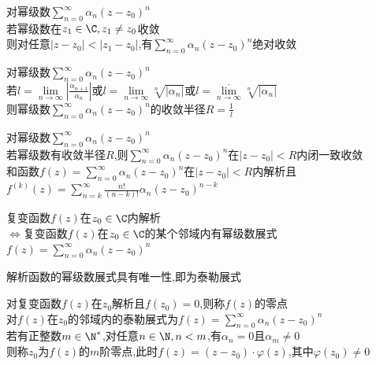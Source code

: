 \begin{dingli}
对幂级数$\sum\limits_{n=0}^{\infty}\alpha_n(z-z_0)^n$\\
若幂级数在$z_1\in \C,z_1\neq z_0$收敛\\
则对任意$|z-z_0|<|z_1-z_0|$,有$\sum\limits_{n=0}^{\infty}\alpha_n(z-z_0)^n$绝对收敛
\end{dingli}

\begin{dingli}
对幂级数$\sum\limits_{n=0}^{\infty}\alpha_n(z-z_0)^n$\\
若$l=\lim\limits_{n\to\infty}|\frac{\alpha_{n+1}}{\alpha_n}|$或$l=\lim\limits_{n\to\infty}\sqrt[n]{|\alpha_n|}$或$l=\overline{\lim\limits_{n\to\infty}}\sqrt[n]{|\alpha_n|}$\\
则幂级数$\sum\limits_{n=0}^{\infty}\alpha_n(z-z_0)^n$的收敛半径$R=\frac{1}{l}$
\end{dingli}

\begin{dingli}
对幂级数$\sum\limits_{n=0}^{\infty}\alpha_n(z-z_0)^n$\\
若幂级数有收敛半径$R$,则$\sum\limits_{n=0}^{\infty}\alpha_n(z-z_0)^n$在$|z-z_0|<R$内闭一致收敛\\
和函数$f(z)=\sum\limits_{n=0}^{\infty}\alpha_n(z-z_0)^n$在$|z-z_0|<R$内解析且$f^{(k)}(z)=\sum\limits_{n=k}^{\infty}\frac{n!}{(n-k)!}\alpha_n(z-z_0)^{n-k}$
\end{dingli}

\begin{dingli}
复变函数$f(z)$在$z_0\in \C$内解析\\
$\Leftrightarrow$复变函数$f(z)$在$z_0\in \C$的某个邻域内有幂级数展式$f(z)=\sum\limits_{n=0}^{\infty}\alpha_n(z-z_0)^n$
\end{dingli}

\begin{tuilun}
解析函数的幂级数展式具有唯一性,即为泰勒展式
\end{tuilun}

\begin{dingyi}
对复变函数$f(z)$在$z_0$解析且$f(z_0)=0$,则称$f(z)$的零点\\
对$f(z)$在$z_0$的邻域内的泰勒展式为$f(z)=\sum\limits_{n=0}^{\infty}\alpha_n(z-z_0)^n$\\
若有正整数$m\in\N^*$,对任意$n\in \N,n<m$,有$\alpha_n=0$且$\alpha_m\neq0$\\
则称$z_0$为$f(z)$的$m$阶零点,此时$f(z)=(z-z_0)\cdot \varphi(z)$,其中$\varphi(z_0)\neq 0$
\end{dingyi}

